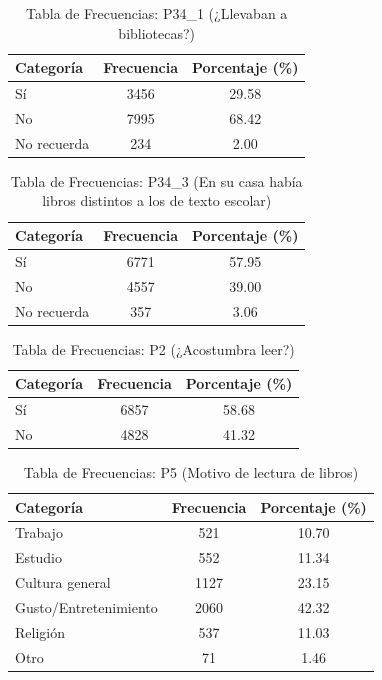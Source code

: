 \documentclass[aps,reprint]{revtex4-2}
\begin{document}
\begin{table}[h!]
\centering
\caption{Tabla de Frecuencias: P34\_1 (¿Llevaban a bibliotecas?)}
\begin{tabular}{lcc}
\hline
\textbf{Categoría} & \textbf{Frecuencia} & \textbf{Porcentaje (\%)} \\
\hline
Sí           & 3456 & 29.58 \\
No           & 7995 & 68.42 \\
No recuerda  & 234  & 2.00  \\
\hline
\end{tabular}
\end{table}

\begin{table}[h!]
\centering
\caption{Tabla de Frecuencias: P34\_3 (En su casa había libros distintos a los de texto escolar)}
\begin{tabular}{lcc}
\hline
\textbf{Categoría} & \textbf{Frecuencia} & \textbf{Porcentaje (\%)} \\
\hline
Sí & 6771 & 57.95 \\
No & 4557 & 39.00 \\
No recuerda & 357 & 3.06 \\
\hline
\end{tabular}
\end{table}

\begin{table}[h!]
\centering
\caption{Tabla de Frecuencias: P2 (¿Acostumbra leer?)}
\begin{tabular}{lcc}
\hline
\textbf{Categoría} & \textbf{Frecuencia} & \textbf{Porcentaje (\%)} \\
\hline
Sí & 6857 & 58.68 \\
No & 4828 & 41.32 \\
\hline
\end{tabular}
\end{table}

\begin{table}[h!]
\centering
\caption{Tabla de Frecuencias: P5 (Motivo de lectura de libros)}
\begin{tabular}{lcc}
\hline
\textbf{Categoría} & \textbf{Frecuencia} & \textbf{Porcentaje (\%)} \\
\hline
Trabajo & 521 & 10.70 \\
Estudio & 552 & 11.34 \\
Cultura general & 1127 & 23.15 \\
Gusto/Entretenimiento & 2060 & 42.32 \\
Religión & 537 & 11.03 \\
Otro & 71 & 1.46 \\
\hline
\end{tabular}
\end{table}
\end{document}
